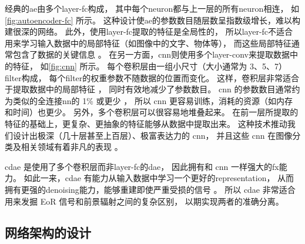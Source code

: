 经典的\ac{ae}由多个\ac{layer-fc}构成，
其中每个\ac{neuron}都与上一层的所有\ac{neuron}相连，
如\autoref{fig:autoencoder-fc} 所示。
这种设计使\ac{ae}的参数数目随层数呈指数级增长，难以构建很深的网络。
此外，使用\ac{layer-fc}提取的特征是全局性的，
所以\ac{layer-fc}不适合用来学习输入数据中的局部特征（如图像中的文字、物体等），
而这些局部特征通常包含了数据的关键信息 \cite{masci2011}。
在另一方面，\ac{cnn}则使用多个\ac{layer-conv}来提取数据中的特征，
如\autoref{fig:cnn} 所示。
每个卷积层由一组小尺寸（大小通常为 3、5、7）\ac{filter}构成，
每个\ac{filter}的权重参数不随数据的位置而变化。
这样，卷积层非常适合于提取数据中的局部特征 \cite{leCun1998}，
同时有效地减少了参数数目。
\ac{cnn} 的参数数目通常约为类似的全连接\ac{nn}的 1\% 或更少 \cite{grais2017}，
所以 \ac{cnn} 更容易训练，消耗的资源（如内存和时间）也更少。
另外，多个卷积层可以很容易地堆叠起来。
在前一层所提取的特征的基础上，更复杂、更抽象的特征能够从数据中提取出来。
这种技术推动我们设计出极深（几十层甚至上百层）、极富表达力的 \ac{cnn}，
并且这些 \ac{cnn} 在图像分类及相关领域有着非凡的表现
\cite{krizhevsky2012,simonyan2014,szegedy2015,ma2019}。

\ac{cdae} 是使用了多个卷积层而非\ac{layer-fc}的\ac{dae}，
因此拥有和 \ac{cnn} 一样强大的\ac{fx}能力。
如此一来，\ac{cdae} 有能力从输入数据中学习一个更好的\ac{representation}，
从而拥有更强的\ac{denoising}能力，能够重建即使严重受损的信号 \cite{du2017}。
所以 \ac{cdae} 非常适合用来发掘 EoR 信号和前景辐射之间的复杂区别，
以期实现两者的准确分离。

\subsection{网络架构的设计}
\label{sec:architecture}

\begin{figure}[htp]
  \centering
\end{figure}

